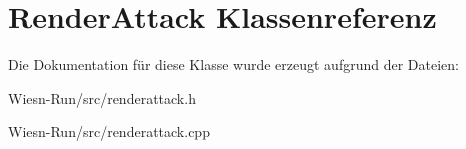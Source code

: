 \hypertarget{classRenderAttack}{\section{Render\-Attack Klassenreferenz}
\label{classRenderAttack}
}


Die Dokumentation für diese Klasse wurde erzeugt aufgrund der Dateien\-:\begin{DoxyCompactItemize}
\item 
Wiesn-\/\-Run/src/renderattack.\-h\item 
Wiesn-\/\-Run/src/renderattack.\-cpp\end{DoxyCompactItemize}
